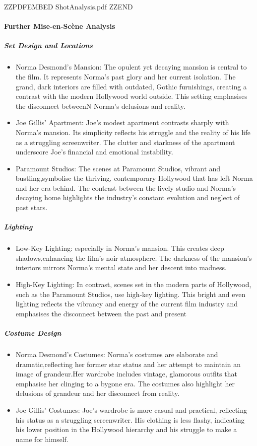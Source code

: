 \documentclass[a4paper]{article}
\begin{document}
ZZPDFEMBED ShotAnalysis.pdf ZZEND






\paragraph{Further Mise-en-Scène Analysis}
\subparagraph{Set Design and Locations}
\begin{itemize}
    \item Norma Desmond’s Mansion: The opulent yet decaying mansion is central to the film. It represents Norma’s past glory and her current isolation. The grand, dark interiors are filled with outdated, Gothic furnishings, creating a contrast with the modern Hollywood world outside. This setting emphasises the disconnect betweenN Norma’s delusions and reality.
    \item Joe Gillis’ Apartment: Joe’s modest apartment contrasts sharply with Norma’s mansion. Its simplicity reflects his struggle and the reality of his life as a struggling screenwriter. The clutter and starkness of the apartment underscore Joe's ﬁnancial and emotional instability.
    \item Paramount Studios: The scenes at Paramount Studios, vibrant and bustling,symbolise the thriving, contemporary Hollywood that has left Norma and her era behind. The contrast between the lively studio and Norma’s decaying home highlights the industry's constant evolution and neglect of past stars.
\end{itemize}

\subparagraph{Lighting}
\begin{itemize}
    \item Low-Key Lighting: especially in Norma’s mansion. This creates deep shadows,enhancing the ﬁlm’s noir atmosphere. The darkness of the mansion’s interiors mirrors Norma’s mental state and her descent into madness.
    \item High-Key Lighting: In contrast, scenes set in the modern parts of Hollywood, such as the Paramount Studios, use high-key lighting. This bright and even lighting reﬂects the vibrancy and energy of the current film industry and emphasises the disconnect between the past and present
\end{itemize}

\subparagraph{Costume Design}
\begin{itemize}
    \item Norma Desmond’s Costumes: Norma’s costumes are elaborate and dramatic,reflecting her former star status and her attempt to maintain an image of grandeur.Her wardrobe includes vintage, glamorous outfits that emphasise her clinging to a bygone era. The costumes also highlight her delusions of grandeur and her disconnect from reality.
    \item Joe Gillis’ Costumes: Joe’s wardrobe is more casual and practical, reflecting his status as a struggling screenwriter. His clothing is less ﬂashy, indicating his lower position in the Hollywood hierarchy and his struggle to make a name for himself.
\end{itemize}
\end{document}
